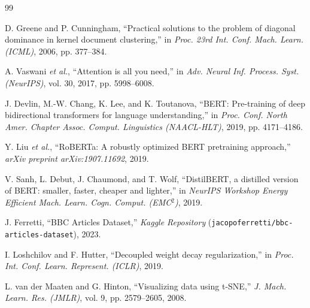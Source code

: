 \documentclass[letterpaper, 10 pt, conference]{ieeeconf}
\begin{document}
\newpage
\begin{thebibliography}{99}
\setlength{\itemsep}{0.2pt}
\setlength{\parskip}{0pt}

 D. Greene and P. Cunningham, ``Practical solutions to the problem of diagonal dominance in kernel document clustering,'' in \textit{Proc. 23rd Int. Conf. Mach. Learn. (ICML)}, 2006, pp. 377--384.

 A. Vaswani \textit{et al.}, ``Attention is all you need,'' in \textit{Adv. Neural Inf. Process. Syst. (NeurIPS)}, vol. 30, 2017, pp. 5998--6008.

 J. Devlin, M.-W. Chang, K. Lee, and K. Toutanova, ``BERT: Pre-training of deep bidirectional transformers for language understanding,'' in \textit{Proc. Conf. North Amer. Chapter Assoc. Comput. Linguistics (NAACL-HLT)}, 2019, pp. 4171--4186.

 Y. Liu \textit{et al.}, ``RoBERTa: A robustly optimized BERT pretraining approach,'' \textit{arXiv preprint arXiv:1907.11692}, 2019.

 V. Sanh, L. Debut, J. Chaumond, and T. Wolf, ``DistilBERT, a distilled version of BERT: smaller, faster, cheaper and lighter,'' in \textit{NeurIPS Workshop Energy Efficient Mach. Learn. Cogn. Comput. (EMC$^2$)}, 2019.

 J. Ferretti, ``BBC Articles Dataset,'' \textit{Kaggle Repository} (\texttt{jacopoferretti/\allowbreak bbc-articles-\allowbreak dataset}), 2023.

 I. Loshchilov and F. Hutter, ``Decoupled weight decay regularization,'' in \textit{Proc. Int. Conf. Learn. Represent. (ICLR)}, 2019.

 L. van der Maaten and G. Hinton, ``Visualizing data using t-SNE,'' \textit{J. Mach. Learn. Res. (JMLR)}, vol. 9, pp. 2579--2605, 2008.

\end{thebibliography}
\end{document}
